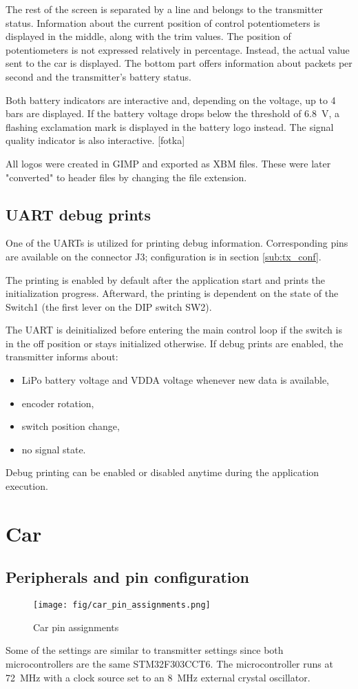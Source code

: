 The rest of the screen is separated by a line and belongs to the transmitter status. Information about the current position of control potentiometers is displayed in the middle, along with the trim values. The position of potentiometers is not expressed relatively in percentage. Instead, the actual value sent to the car is displayed. The bottom part offers information about packets per second and the transmitter's battery status.

Both battery indicators are interactive and, depending on the voltage, up to 4 bars are displayed. If the battery voltage drops below the threshold of \SI{6.8}{\V}, a flashing exclamation mark is displayed in the battery logo instead. The signal quality indicator is also interactive. [\todo fotka]

All logos were created in GIMP and exported as XBM files. These were later "converted" to header files by changing the file extension.

\subsection{UART debug prints}
One of the UARTs is utilized for printing debug information. Corresponding pins are available on the connector J3; configuration is in section \ref{sub:tx_conf}.

The printing is enabled by default after the application start and prints the initialization progress. Afterward, the printing is dependent on the state of the Switch1 (the first lever on the DIP switch SW2).

The UART is deinitialized before entering the main control loop if the switch is in the off position or stays initialized otherwise. If debug prints are enabled, the transmitter informs about:
\begin{itemize}
\item LiPo battery voltage and VDDA voltage whenever new data is available,
\item encoder rotation,
\item switch position change,
\item no signal state.
\end{itemize}
Debug printing can be enabled or disabled anytime during the application execution.



\section{Car}
\subsection{Peripherals and pin configuration}
\begin{figure}[t]
\centering
\texttt{[image: fig/car\_pin\_assignments.png]}
\caption{Car pin assignments}
\label{fig:car_conf}
\end{figure}
Some of the settings are similar to transmitter settings since both microcontrollers are the same STM32F303CCT6. The microcontroller runs at \SI{72}{\MHz} with a clock source set to an \SI{8}{\MHz} external crystal oscillator.

